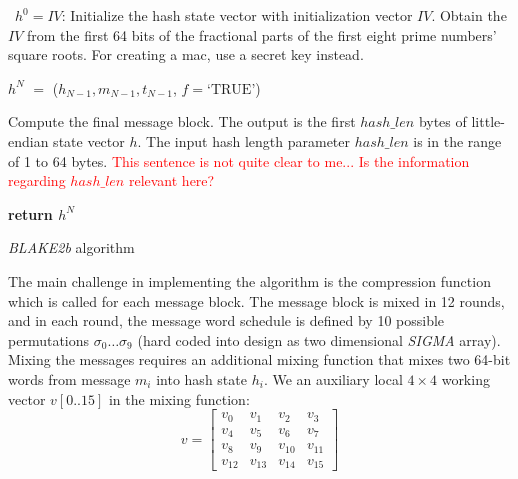 \documentclass[%
	a4paper,
]
{article}
\newcommand{\todo}[1]{\textcolor{red}{#1}}
\begin{document}
\begin{algorithm}
\justifying

	\ $h^{0}=IV$: Initialize the hash state vector with initialization
		vector $IV$. Obtain the $IV$ from the first 64 bits of the fractional
		parts of the first eight prime numbers' square roots. For creating
		a \gls{mac}, use a secret key instead.

	\BlankLine
	

	\BlankLine
	

	$h^{N}$ $=$ ($h_{N-1}, m_{N-1},t_{N-1}$, $f=\textrm{`TRUE'} $) \

		Compute the final message block. The output is the first $hash\_len$
		bytes of little-endian state vector $h$. The input hash length parameter
		$hash\_len$ is in the range of 1 to 64 bytes.
		\todo{This sentence is not quite clear to me... Is the information
		regarding $hash\_len$ relevant here?}

	\BlankLine

	\textbf{return $h^{N}$}
	
	\caption{\emph{BLAKE2b} algorithm}
	\label{alg:bbs}
	
\end{algorithm}

The main challenge in implementing the algorithm is the compression function
which is called for each message block.
%
The message block is mixed in 12 rounds, and in each round, the message word
schedule is defined by 10 possible permutations $\sigma_0\dots\sigma_9$ (hard
coded into design as two dimensional \emph{SIGMA} array).
%
Mixing the messages requires an additional mixing function that mixes two
64-bit words from message $m_i$ into hash state $h_i$. We an auxiliary
local $4\times{}4$ working vector $v[0..15]$ in the  mixing function:
\[
   v=
  \left[ {\begin{array}{cccc}
   v_0 & v_1 &v_2 & v_3 \\
   v_4 & v_5 &v_6 & v_7\\
   v_8 & v_9 &v_{10} & v_{11}\\
   v_{12} & v_{13} &v_{14} & v_{15}
  \end{array} } \right]
\]
	    
\end{document}

